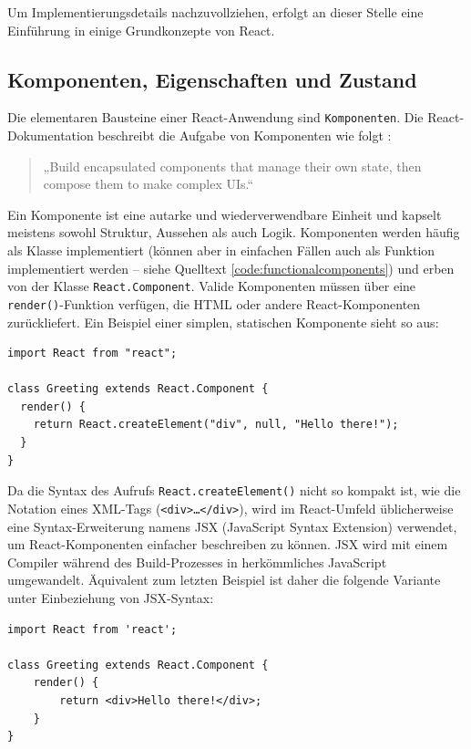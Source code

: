 Um Implementierungsdetails nachzuvollziehen, erfolgt an dieser Stelle eine Einführung in einige Grundkonzepte von React.

\subsection{Komponenten, Eigenschaften und Zustand}
Die elementaren Bausteine einer React-Anwendung sind \texttt{Komponenten}. Die React-Dokumentation beschreibt die Aufgabe von Komponenten wie folgt \cite[Header-Sektion]{web:react}:
\begin{quote}
„Build encapsulated components that manage their own state, then compose them to make complex UIs.“
\end{quote}

Ein Komponente ist eine autarke und wiederverwendbare Einheit und kapselt meistens sowohl Struktur, Aussehen als auch Logik. Komponenten werden häufig als Klasse implementiert (können aber in einfachen Fällen auch als Funktion implementiert werden – siehe Quelltext \ref{code:functionalcomponents}) und erben von der Klasse \texttt{React.Component}. Valide Komponenten müssen über eine \texttt{render()}-Funktion verfügen, die HTML oder andere React-Komponenten zurückliefert. Ein Beispiel einer simplen, statischen Komponente sieht so aus:

\begin{minipage}{\linewidth}
\begin{lstlisting}[caption={Einfache React-Komponente ohne JSX-Syntax.}]
import React from "react";

class Greeting extends React.Component {
  render() {
    return React.createElement("div", null, "Hello there!");
  }
}
\end{lstlisting}
\end{minipage}

Da die Syntax des Aufrufs \texttt{React.createElement()} nicht so kompakt ist, wie die Notation eines XML-Tags (\texttt{<div>\dots</div>}), wird im React-Umfeld üblicherweise eine Syntax-Erweiterung namens JSX (JavaScript Syntax Extension) verwendet, um React-Komponenten einfacher beschreiben zu können. JSX wird mit einem Compiler während des Build-Prozesses in herkömmliches JavaScript umgewandelt. Äquivalent zum letzten Beispiel ist daher die folgende Variante unter Einbeziehung von JSX-Syntax:

\begin{minipage}{\linewidth}
\begin{lstlisting}[caption={Einfache React-Komponente mit JSX-Syntax.}]
import React from 'react';

class Greeting extends React.Component {
    render() {
        return <div>Hello there!</div>;
    }
}
\end{lstlisting}
\end{minipage}

